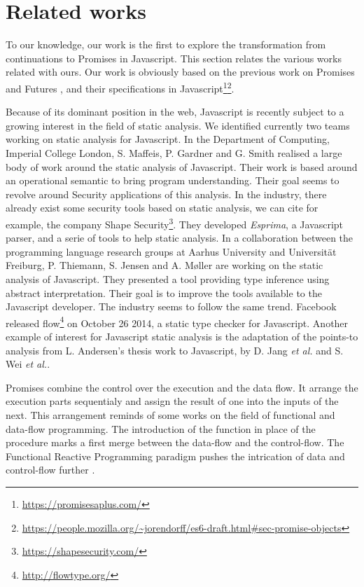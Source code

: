 \section{Related works} \label{section:related}

To our knowledge, our work is the first to explore the transformation from continuations to Promises in Javascript.
This section relates the various works related with ours.
Our work is obviously based on the previous work on Promises and Futures \cite{Liskov1988}, and their specifications in Javascript\footnote{\url{https://promisesaplus.com/}}\footnote{\url{https://people.mozilla.org/~jorendorff/es6-draft.html\#sec-promise-objects}}.


Because of its dominant position in the web, Javascript is recently subject to a growing interest in the field of static analysis.
We identified currently two teams working on static analysis for Javascript.
In the Department of Computing, Imperial College London, S. Maffeis, P. Gardner and G. Smith realised a large body of work around the static analysis of Javascript.
Their work is based around an operational semantic\cite{Maffeis2008} to bring program understanding\cite{Smith2011,Gardner2012,Gardner2013,Bodin2014}.
Their goal seems to revolve around Security applications of this analysis\cite{Maffeis2009,Maffeis2009a}.
In the industry, there already exist some security tools based on static analysis, we can cite for example, the company Shape Security\footnote{\url{https://shapesecurity.com/}}.
They developed \textit{Esprima}, a Javascript parser, and a serie of tools to help static analysis.
In a collaboration between the programming language research groups at Aarhus University and Universität Freiburg, P. Thiemann, S. Jensen and A. Møller are working on the static analysis of Javascript.
They presented a tool providing type inference using abstract interpretation\cite{Thiemann2005,Jensen2009,Jensen2012}.
Their goal is to improve the tools available to the Javascript developer\cite{Andreasen}.
The industry seems to follow the same trend.
Facebook released flow\footnote{\url{http://flowtype.org/}} on October 26 2014, a static type checker for Javascript.
Another example of interest for Javascript static analysis is the adaptation of the points-to analysis from L. Andersen's thesis work\cite{Andersen1994} to Javascript, by D. Jang \textit{et al.}\cite{Jang2009} and S. Wei \textit{et al.}\cite{Wei2014}.


Promises combine the control over the execution and the data flow.
It arrange the execution parts sequentialy and assign the result of one into the inputs of the next.
This arrangement reminds of some works on the field of functional and data-flow programming.
The introduction of the function in place of the procedure marks a first merge between the data-flow and the control-flow.
The Functional Reactive Programming paradigm pushes the intrication of data and control-flow further \cite{Winograd-Cort2013,Elliott1997}.



